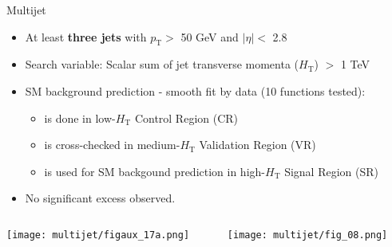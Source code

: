 \documentclass[8pt]{beamer}
\begin{document}
\begin{frame}{\large Multijet}
 \begin{itemize}
  \item At least \textbf{three jets} with $p_\mathrm{T} >$ 50 GeV and $|\eta| <$ 2.8
  \vspace{0.2cm}
  \item Search variable: Scalar sum of jet transverse momenta ($H_\mathrm{T}$) $>$ 1 TeV
  \vspace{0.2cm}
  \item SM background prediction - smooth fit by data (10 functions tested):
  \begin{itemize}
   \item is done in low-$H_\mathrm{T}$ Control Region (CR)
   \item is cross-checked in medium-$H_\mathrm{T}$ Validation Region (VR)
   \item is used for SM backgound prediction in high-$H_\mathrm{T}$ Signal Region (SR)
  \end{itemize}
  \vspace{0.2cm}
  \item No significant excess observed.
 \end{itemize}
 \vspace{0.2cm}
 \begin{columns}
  \begin{column}{7cm}
   {\centering
   \texttt{[image: multijet/figaux\_17a.png]}\\
   }
  \end{column}
  \begin{column}{5cm}
  {\centering
   \texttt{[image: multijet/fig\_08.png]}\\
   }
  \end{column}
 \end{columns}

  \begin{tikzpicture}[overlay]


\end{tikzpicture}
\end{frame}
\end{document}
